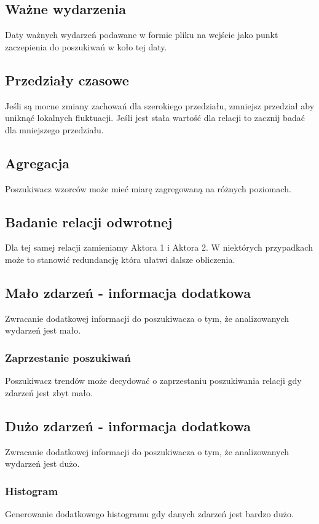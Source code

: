 \documentclass[11pt]{report}
\begin{document}
    \subsection{Ważne wydarzenia}
    Daty ważnych wydarzeń podawane w formie pliku na wejście jako punkt zaczepienia do poszukiwań w koło tej daty.

    \subsection{Przedziały czasowe}\label{subsec:przedziały-czasowe}
    Jeśli są mocne zmiany zachowań dla szerokiego przedziału, zmniejsz przedział aby uniknąć lokalnych fluktuacji.
    Jeśli jest stała wartość dla relacji to zacznij badać dla mniejszego przedziału.

    \subsection{Agregacja}
    Poszukiwacz wzorców może mieć miarę zagregowaną na różnych poziomach.

    \subsection{Badanie relacji odwrotnej}
    Dla tej samej relacji zamieniamy Aktora 1 i Aktora 2.
    W niektórych przypadkach może to stanowić redundancję która ułatwi dalsze obliczenia.

    \subsection{Mało zdarzeń - informacja dodatkowa}
    Zwracanie dodatkowej informacji do poszukiwacza o tym, że analizowanych wydarzeń jest mało.

    \subsubsection{Zaprzestanie poszukiwań}
    Poszukiwacz trendów może decydować o zaprzestaniu poszukiwania relacji gdy zdarzeń jest zbyt mało.

    \subsection{Dużo zdarzeń - informacja dodatkowa}
    Zwracanie dodatkowej informacji do poszukiwacza o tym, że analizowanych wydarzeń jest dużo.

    \subsubsection{Histogram}
    Generowanie dodatkowego histogramu gdy danych zdarzeń jest bardzo dużo.
\end{document}
